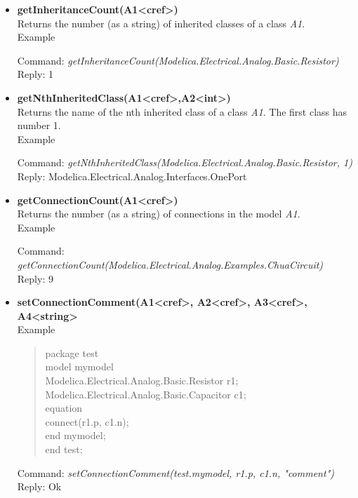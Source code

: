 \documentclass[11pt,a4paper,oneside,english]{book}
\newenvironment{modelicaExamples}{\begin{itemize}}{\end{itemize}}
\newcommand{\api}[2]{\item \textbf{#1} \\ #2}
\newcommand{\tab}{\hspace{2em}}
\newcommand{\command}[1]{Command: \textit{#1}\\}
\newcommand{\reply}[1]{Reply: #1}
\newcommand{\functionex}[2]{\begin{singlespace} \command{#1} \reply{#2} \end{singlespace}}
\newcommand{\examples}{Example}
\newenvironment{mocode}{\begin{verse}\begin{singlespace}\begin{scriptsize}\ttfamily}{\end{scriptsize}\end{singlespace}\end{verse}}
\begin{document}
\begin{modelicaExamples}
			\functionex{setComponentModifierValue(test.mymodel, r1.min, Code(()))}
			{Ok}

			\begin{mocode}
			\dots \\
			Modelica.Electrical.Analog.Basic.Resistor r1(start=2)=Resistor(R=2);\\
			\dots \\
			\end{mocode}
			\functionex{setComponentModifierValue(test.mymodel, r1, Code(()))}
			{Ok}

			\begin{mocode}
			\dots \\
			Modelica.Electrical.Analog.Basic.Resistor r1(start=2);\\
			\dots \\
			\end{mocode}
			\functionex{setComponentModifierValue(test.mymodel, r1.start, Code(()))}
			{Ok}

			\begin{mocode}
			\dots \\
			Modelica.Electrical.Analog.Basic.Resistor r1;\\
			\dots \\
			\end{mocode}

		\api{getInheritanceCount(A1<cref>)}{Returns the number (as a string) of inherited classes of a class \textit{A1}.\\
		\examples
		\functionex{getInheritanceCount(Modelica.Electrical.Analog.Basic.Resistor)}
		{1}
		}

		\api{getNthInheritedClass(A1<cref>,A2<int>)}{Returns the name of the nth inherited class of a class \textit{A1}. The first class has number 1.\\
		\examples
		\functionex{getNthInheritedClass(Modelica.Electrical.Analog.Basic.Resistor, 1)}
		{Modelica.Electrical.Analog.Interfaces.OnePort}
		}

		\api{getConnectionCount(A1<cref>)}{Returns the number (as a string) of connections in the model \textit{A1}.\\
		\examples
		\functionex{getConnectionCount(Modelica.Electrical.Analog.Examples.Chua\-Circuit)}
		{9}
		}

		\api{setConnectionComment(A1<cref>, A2<cref>, A3<cref>, A4<string>}{
		\examples
		\begin{mocode}
		package test\\
		\tab model mymodel\\
		\tab\tab Modelica.Electrical.Analog.Basic.Resistor r1;\\
		\tab\tab Modelica.Electrical.Analog.Basic.Capacitor c1;\\
		\tab equation\\
		\tab\tab connect(r1.p, c1.n);\\
		\tab end mymodel;\\
		end test;\\
		\end{mocode}
		\functionex{setConnectionComment(test.mymodel, r1.p, c1.n, "comment")}
		{Ok}

}
\end{modelicaExamples}
\end{document}

